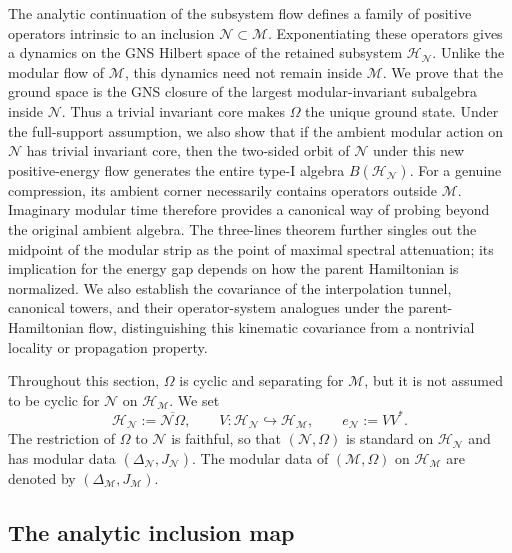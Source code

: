 \documentclass[a4paper,11pt]{article}
\theoremstyle{definition}
\newcommand{\mN}{\mathcal{N}}
\newcommand{\mH}{\mathcal{H}}
\newcommand{\mM}{\mathcal{M}}
\begin{document}
The analytic continuation of the subsystem flow defines a family of positive
operators intrinsic to an inclusion $\mN\subset \mM$. Exponentiating these operators gives a dynamics on the GNS
Hilbert space of the retained subsystem $\mH_{\mN}$. Unlike the modular flow of
$\mM$, this dynamics need not remain inside $\mM$. We prove that the ground space is the GNS closure of the
largest modular-invariant subalgebra inside $\mN$. Thus a trivial invariant
core makes $\Omega$ the unique ground state. Under the full-support
assumption, we also show
that if the ambient modular action on $\mN$ has trivial invariant core, then
the two-sided orbit of $\mN$ under this new positive-energy flow
generates the entire type-I algebra $B(\mH_{\mN})$. For a genuine compression,
its ambient corner necessarily contains operators outside $\mM$. Imaginary modular time therefore
provides a canonical way of probing beyond the original ambient algebra.
The three-lines theorem further singles out the midpoint of the modular strip
as the point of maximal spectral attenuation; its implication for the energy
gap depends on how the parent Hamiltonian is normalized. We also establish
the covariance of the interpolation tunnel, canonical towers, and their
operator-system analogues under the parent-Hamiltonian flow, distinguishing
this kinematic covariance from a nontrivial locality or propagation property.

Throughout this section, $\Omega$ is cyclic and separating for
$\mM$, but it is not assumed to be cyclic for $\mN$ on
$\mH_{\mM}$. We set
\begin{equation}
    \mH_{\mN}
    :=
    \overline{\mN\Omega},
    \qquad
    V:\mH_{\mN}\hookrightarrow\mH_{\mM},
    \qquad
    e_{\mN}:=VV^* .
    \label{eq:probing-HN}
\end{equation}
The restriction of $\Omega$ to $\mN$ is faithful, so that
$(\mN,\Omega)$ is standard on $\mH_{\mN}$ and has modular data
$(\Delta_{\mN},J_{\mN})$. The modular data of $(\mM,\Omega)$ on
$\mH_{\mM}$ are denoted by $(\Delta_{\mM},J_{\mM})$.

\subsection{The analytic inclusion map}
\end{document}
